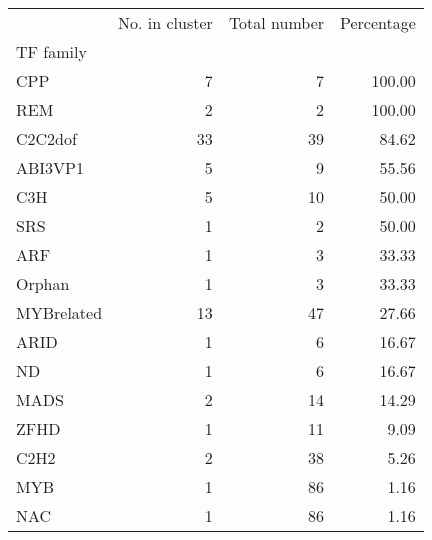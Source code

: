 \begin{tabular}{lrrr}
\toprule
{} &  No. in cluster &  Total number &  Percentage \\
TF family  &                 &               &             \\
\midrule
CPP        &               7 &             7 &      100.00 \\
REM        &               2 &             2 &      100.00 \\
C2C2dof    &              33 &            39 &       84.62 \\
ABI3VP1    &               5 &             9 &       55.56 \\
C3H        &               5 &            10 &       50.00 \\
SRS        &               1 &             2 &       50.00 \\
ARF        &               1 &             3 &       33.33 \\
Orphan     &               1 &             3 &       33.33 \\
MYBrelated &              13 &            47 &       27.66 \\
ARID       &               1 &             6 &       16.67 \\
ND         &               1 &             6 &       16.67 \\
MADS       &               2 &            14 &       14.29 \\
ZFHD       &               1 &            11 &        9.09 \\
C2H2       &               2 &            38 &        5.26 \\
MYB        &               1 &            86 &        1.16 \\
NAC        &               1 &            86 &        1.16 \\
\bottomrule
\end{tabular}
